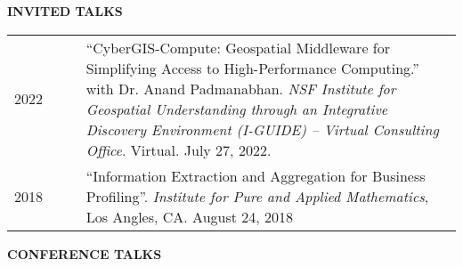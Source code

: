 \documentclass{acmcv}
\begin{document}

    \textbf{\uppercase{Invited Talks}}

    \begin{longtable}{p{0.16\linewidth} p{0.84\linewidth}}
        2022 & ``CyberGIS-Compute: Geospatial Middleware for Simplifying Access to High-Performance Computing.'' with Dr. Anand Padmanabhan. \textit{NSF Institute for Geospatial Understanding through an Integrative Discovery Environment (I-GUIDE) – Virtual Consulting Office}. Virtual. July 27, 2022. \\

        2018 & ``Information Extraction and Aggregation for Business Profiling''. \textit{Institute for Pure and Applied Mathematics}, Los Angles, CA. August 24, 2018 \\

    \end{longtable}

	\textbf{\uppercase{Conference Talks}}
\end{document}
